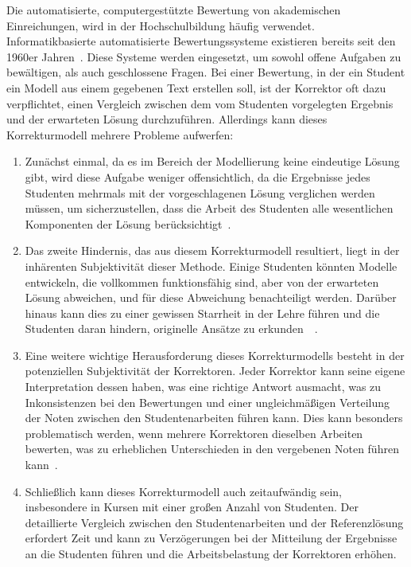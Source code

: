 Die automatisierte, computergestützte Bewertung von akademischen Einreichungen, wird in der Hochschulbildung häufig verwendet. Informatikbasierte automatisierte Bewertungssysteme existieren bereits seit den 1960er Jahren~\cite{ullrich2021automated}. Diese Systeme werden eingesetzt, um sowohl offene Aufgaben zu bewältigen, als auch geschlossene Fragen.  Bei einer Bewertung, in der ein Student ein Modell aus einem gegebenen Text erstellen soll, ist der Korrektor oft dazu verpflichtet, einen Vergleich zwischen dem vom Studenten vorgelegten Ergebnis und der erwarteten Lösung durchzuführen. Allerdings kann dieses Korrekturmodell mehrere Probleme aufwerfen:

\begin{enumerate}
    \item Zunächst einmal, da es im Bereich der Modellierung keine eindeutige Lösung gibt, wird diese Aufgabe weniger offensichtlich, da die Ergebnisse jedes Studenten mehrmals mit der vorgeschlagenen Lösung verglichen werden müssen, um sicherzustellen, dass die Arbeit des Studenten alle wesentlichen Komponenten der Lösung berücksichtigt~\cite{geer1988open}.
    \item Das zweite Hindernis, das aus diesem Korrekturmodell resultiert, liegt in der inhärenten Subjektivität dieser Methode. Einige Studenten könnten Modelle entwickeln, die vollkommen funktionsfähig sind, aber von der erwarteten Lösung abweichen, und für diese Abweichung benachteiligt werden. Darüber hinaus kann dies zu einer gewissen Starrheit in der Lehre führen und die Studenten daran hindern, originelle Ansätze zu erkunden~\cite{mccann2010factors}~\cite{hancock1995implementing}.
    \item Eine weitere wichtige Herausforderung dieses Korrekturmodells besteht in der potenziellen Subjektivität der Korrektoren. Jeder Korrektor kann seine eigene Interpretation dessen haben, was eine richtige Antwort ausmacht, was zu Inkonsistenzen bei den Bewertungen und einer ungleichmäßigen Verteilung der Noten zwischen den Studentenarbeiten führen kann. Dies kann besonders problematisch werden, wenn mehrere Korrektoren dieselben Arbeiten bewerten, was zu erheblichen Unterschieden in den vergebenen Noten führen kann~\cite{mccann2010factors}.
    \item Schließlich kann dieses Korrekturmodell auch zeitaufwändig sein, insbesondere in Kursen mit einer großen Anzahl von Studenten. Der detaillierte Vergleich zwischen den Studentenarbeiten und der Referenzlösung erfordert Zeit und kann zu Verzögerungen bei der Mitteilung der Ergebnisse an die Studenten führen und die Arbeitsbelastung der Korrektoren erhöhen.
\end{enumerate}

